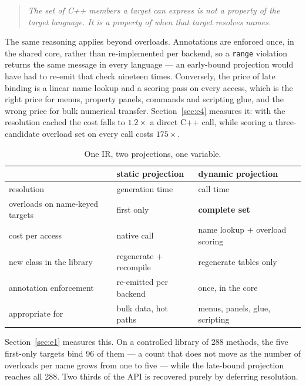 \documentclass[11pt,a4paper]{article}
\newcommand{\code}[1]{\texttt{\small #1}}
\begin{document}
\begin{quote}\itshape
The set of C++ members a target can express is not a property of the target
language. It is a property of when that target resolves names.
\end{quote}

The same reasoning applies beyond overloads. Annotations are enforced once, in
the shared core, rather than re-implemented per backend, so a \code{range}
violation returns the same message in every language --- an early-bound
projection would have had to re-emit that check nineteen times. Conversely, the
price of late binding is a linear name lookup and a scoring pass on every
access, which is the right price for menus, property panels, commands and
scripting glue, and the wrong price for bulk numerical transfer.
Section~\ref{sec:e4} measures it: with the resolution cached the cost falls to
$1.2\times$ a direct C++ call, while scoring a three-candidate overload set on
every call costs $175\times$.

\begin{table}[h]
\centering\small
\begin{tabular}{lll}
\toprule
 & static projection & dynamic projection \\
\midrule
resolution & generation time & call time \\
overloads on name-keyed targets & first only & \textbf{complete set} \\
cost per access & native call & name lookup $+$ overload scoring \\
new class in the library & regenerate + recompile & regenerate tables only \\
annotation enforcement & re-emitted per backend & once, in the core \\
appropriate for & bulk data, hot paths & menus, panels, glue, scripting \\
\bottomrule
\end{tabular}
\caption{One IR, two projections, one variable.}
\label{tab:projections}
\end{table}

Section~\ref{sec:e1} measures this. On a controlled library of 288 methods,
the five first-only targets bind 96 of them --- a count that does not move as
the number of overloads per name grows from one to five --- while the late-bound
projection reaches all 288. Two thirds of the API is recovered purely by
deferring resolution.

\end{document}
